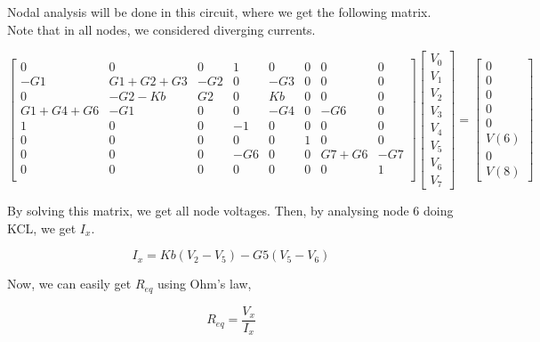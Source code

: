 \par Nodal analysis will be done in this circuit, where we get the following matrix. Note that in all nodes, we considered diverging currents.

$$
\begin{bmatrix}
0 & 0 & 0 & 1 & 0 & 0 & 0 & 0 \\
-G1 & G1+G2+G3 & -G2 & 0 & -G3 & 0 & 0 & 0 \\
0 & -G2-Kb & G2 & 0 & Kb & 0 & 0 & 0 \\
G1+G4+G6 & -G1 & 0 & 0 & -G4 & 0 & -G6 & 0 \\
1 & 0 & 0 & -1 & 0 & 0 & 0 & 0 \\
0 & 0 & 0 & 0 & 0 & 1 & 0 & 0 \\
0 & 0 & 0 & -G6 & 0 & 0 & G7+G6 & -G7 \\
0 & 0 & 0 & 0 & 0 & 0 & 0 & 1 \\
\end{bmatrix}
\begin{bmatrix}
V_0 \\
V_1 \\
V_2 \\
V_3 \\
V_4 \\
V_5 \\
V_6 \\
V_7  
\end{bmatrix}
=
\begin{bmatrix}
0 \\
0 \\
0 \\
0 \\
0 \\
V(6) \\
0 \\
V(8)  
\end{bmatrix}
$$

\par By solving this matrix, we get all node voltages. Then, by analysing node 6 doing KCL, we get $I_x$.

\begin{equation}
  I_{x} = Kb(V_2-V_5) - G5(V_5-V_6)
  \label{eq:2)aux1}
\end{equation}

\par Now, we can easily get $R_{eq}$ using Ohm's law,

\begin{equation}
  R_{eq} = \frac{V_x}{I_x}
  \label{eq:2)aux2}
\end{equation}

